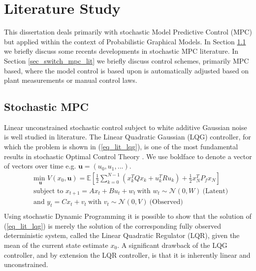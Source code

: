\section{Literature Study}
This dissertation deals primarily with stochastic Model Predictive Control (MPC) but applied within the context of Probabilistic Graphical Models. In Section \ref{sec_stoch_mpc_lit} we briefly discuss some recents developments in stochastic MPC literature. In Section \ref{sec_switch_mpc_lit} we briefly discuss control schemes, primarily MPC based, where the model control is based upon is automatically adjusted based on plant measurements or manual control laws.

\subsection{Stochastic MPC}
\label{sec_stoch_mpc_lit}
Linear unconstrained stochastic control subject to white additive Gaussian noise is well studied in literature. The Linear Quadratic Gaussian (LQG) controller, for which the problem is shown in (\ref{eq_lit_lqg}), is one of the most fundamental results in stochastic Optimal Control Theory \cite{lqg}. We use boldface to denote a vector of vectors over time e.g. $\mathbf{u}=(u_0, u_1,...)$.
\begin{equation}
\begin{aligned}
&\underset{\mathbf{u}}{\text{min }} V(x_0, \mathbf{u}) = \mathbb{E}\left[ \frac{1}{2}\sum_{k=0}^{N-1} \left( x_k^TQx_k + u_k^TRu_k \right) + \frac{1}{2}x_N^TP_fx_N \right] \\
& \text{subject to } x_{t+1}=Ax_t+Bu_t + w_t~\text{with } w_t \sim \mathcal{N}(0, W)~\text{(Latent)} \\
& \text{and } y_{t}= Cx_t + v_t ~\text{with } v_t \sim \mathcal{N}(0, V)~\text{(Observed)}\\
\end{aligned}
\label{eq_lit_lqg}
\end{equation}
Using stochastic Dynamic Programming it is possible to show that the solution of (\ref{eq_lit_lqg}) is merely the solution of the corresponding fully observed deterministic system, called the Linear Quadratic Regulator (LQR), given the mean of the current state estimate $x_0$. A significant drawback of the LQG controller, and by extension the LQR controller, is that it is inherently linear and unconstrained.

